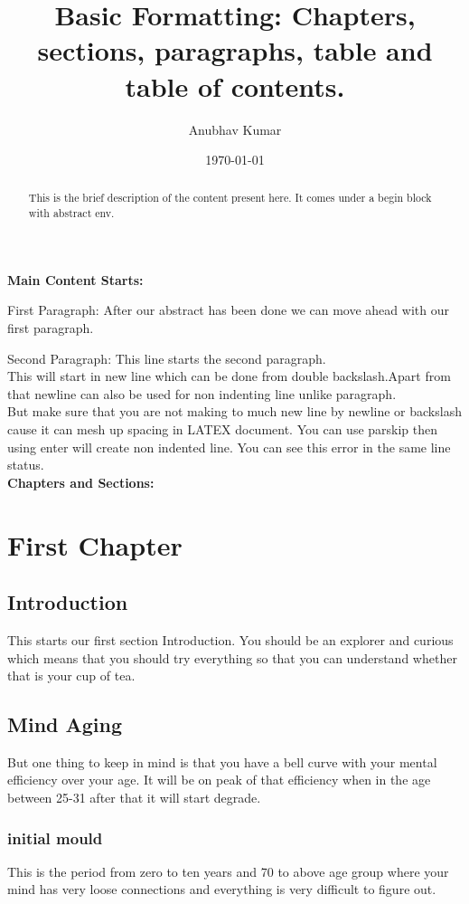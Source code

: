 \documentclass[12pt]{report}
\title{Basic Formatting: Chapters, sections, paragraphs, table and table of contents.}
\author{Anubhav Kumar}
\date{\today}
\begin{document}
\maketitle
\tableofcontents

\begin{abstract}
    This is the brief description of the content present here. It comes under a begin block with abstract env.
\end{abstract}



\textbf{Main Content Starts:}

First Paragraph: After our abstract has been done we can move ahead with our first paragraph.

Second Paragraph: This line starts the second paragraph. \\This will start in new line which can be done from double backslash.\newline Apart from that newline can also be used for non indenting line unlike paragraph.\\But make sure that you are not making to much new line by newline or backslash cause it can mesh up spacing in LATEX document. You can use parskip then using enter will create non indented line. You can see this error in the same line status.\\

\textbf{Chapters and Sections:}

\chapter{First Chapter}

\section{Introduction}
This starts our first section Introduction. You should be an explorer and curious which means that you should try everything so that you can understand whether that is your cup of tea.
\section{Mind Aging}
But one thing to keep in mind is that you have a bell curve with your mental efficiency over your age. It will be on peak of that efficiency when in the age between 25-31 after that it will start degrade.
\subsection{initial mould}
This is the period from zero to ten years and 70 to above age group where your mind has very loose connections and everything is very difficult to figure out.
\end{document}
